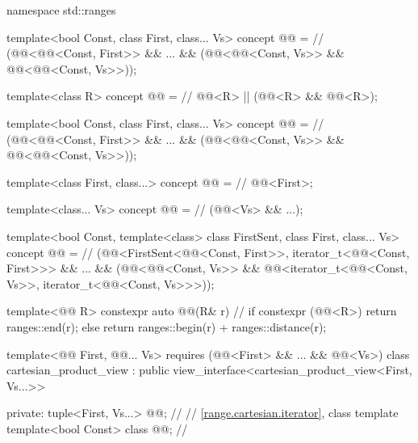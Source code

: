 %
\begin{codeblock}
namespace std::ranges {
  template<bool Const, class First, class... Vs>
  concept @@ =          // \expos
    (@@<@@<Const, First>> && ... &&
      (@@<@@<Const, Vs>>
        && @@<@@<Const, Vs>>));

  template<class R>
  concept @@ =                // \expos
    @@<R> || (@@<R> && @@<R>);

  template<bool Const, class First, class... Vs>
  concept @@ =          // \expos
    (@@<@@<Const, First>> && ... &&
      (@@<@@<Const, Vs>>
        && @@<@@<Const, Vs>>));

  template<class First, class...>
  concept @@ =                 // \expos
    @@<First>;

  template<class... Vs>
  concept @@ =                  // \expos
    (@@<Vs> && ...);

  template<bool Const, template<class> class FirstSent, class First, class... Vs>
    concept @@ =               // \expos
      (@@<FirstSent<@@<Const, First>>,
          iterator_t<@@<Const, First>>> && ...
        && (@@<@@<Const, Vs>>
          && @@<iterator_t<@@<Const, Vs>>,
              iterator_t<@@<Const, Vs>>>));

  template<@@ R>
  constexpr auto @@(R& r) {       // \expos
    if constexpr (@@<R>) {
      return ranges::end(r);
    } else {
      return ranges::begin(r) + ranges::distance(r);
    }
  }

  template<@@ First, @@... Vs>
    requires (@@<First> && ... && @@<Vs>)
  class cartesian_product_view : public view_interface<cartesian_product_view<First, Vs...>> {
  private:
    tuple<First, Vs...> @@;                 // \expos
    // \ref{range.cartesian.iterator}, class template 
    template<bool Const> class @@;       // \expos

}}
\end{codeblock}
